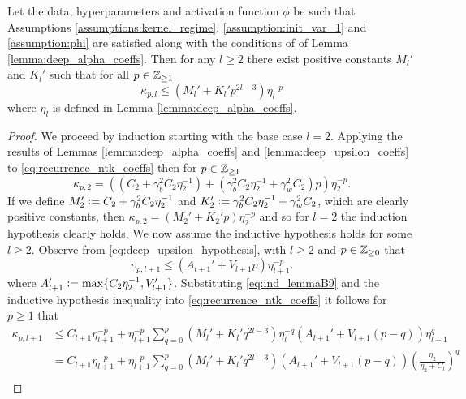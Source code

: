 \begin{lemma}\label{lemma:deep_coeffs}
    Let the data, hyperparameters and activation function $\phi$ be such that Assumptions \ref{assumptions:kernel_regime}, \ref{assumption:init_var_1} and \ref{assumption:phi} are satisfied along with the conditions of of Lemma \ref{lemma:deep_alpha_coeffs}. Then for any $l \geq 2$ there exist positive constants $M_l'$ and $K_l'$ such that for all $p \in \mathbb{Z}_{\geq 1}$
    \begin{equation}\label{eq:exp_ntk_deep_coeffs}
        \kappa_{p,l} \leq (M_l' + K_l'p^{2l-3}) \eta_l^{-p}
    \end{equation}
    where $\eta_l$ is defined in Lemma \ref{lemma:deep_alpha_coeffs}.
\end{lemma}

\begin{proof}
We proceed by induction starting with the base case $l=2$. Applying the results of Lemmas \ref{lemma:deep_alpha_coeffs} and \ref{lemma:deep_upsilon_coeffs} to \eqref{eq:recurrence_ntk_coeffs} then for $p \in \mathbb{Z}_{\geq 1}$
 \begin{equation}
        \kappa_{p,2} = ((C_2 + \gamma_b^2C_2 \eta_2^{-1}) + (\gamma_b^2C_2 \eta_2^{-1} + \gamma_w^2 C_2)p)\eta_{2}^{-p}.
\end{equation}
If we define $M_2' \vcentcolon= C_2 + \gamma_b^2 C_2 \eta_2^{-1}$ and $ K_2' \vcentcolon= \gamma_b^2C_2 \eta_2^{-1} + \gamma_w^2 C_2$, which are clearly positive constants, then $\kappa_{p,2} = (M_2' + K_2'p)\eta_2^{-p}$ and so for $l=2$ the induction hypothesis clearly holds. We now assume the inductive hypothesis holds for some $l \geq 2$. Observe from \eqref{eq:deep_upsilon_hypothesis}, with $l \geq 2$ and $p \in \mathbb{Z}_{\geq 0}$ that
\begin{equation}\label{eq:ind_lemmaB9}
\upsilon_{p,l+1} \leq (A_{l+1}' + V_{l+1} p)\eta_{l+1}^{-p}.
\end{equation}
where $A_{l+1}' \vcentcolon= \max\{C_2\eta_2^{-1}, V_{l+1}'\}$.
Substituting \ref{eq:ind_lemmaB9} and the inductive hypothesis inequality into \eqref{eq:recurrence_ntk_coeffs} it follows for $p \geq 1$ that
\[
\begin{aligned}
\kappa_{p,l+1} &\leq C_{l+1} \eta_{l+1}^{-p} + \eta_{l+1}^{-p} \sum_{q=0}^p (M_l' + K_l' q^{2l-3})\eta_{l}^{-q}(A_{l+1}' + V_{l+1} (p-q))\eta_{l+1}^q\\
&= C_{l+1} \eta_{l+1}^{-p} + \eta_{l+1}^{-p} \sum_{q=0}^p (M_l' + K_l' q^{2l-3})(A_{l+1}' + V_{l+1} (p-q))\left(\frac{\eta_2}{\eta_2 + C_l}\right)^q\\

\end{aligned}\]
\end{proof}
